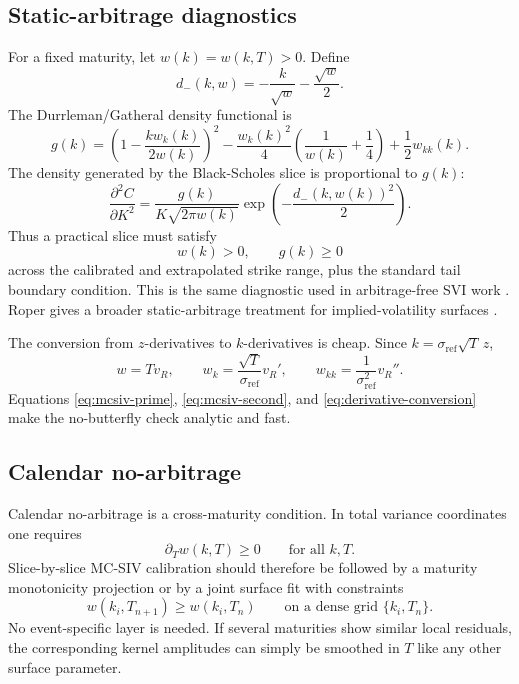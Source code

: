 \documentclass[11pt]{article}
\newcommand{\sigref}{\sigma_{\mathrm{ref}}}
\begin{document}
\subsection{Static-arbitrage diagnostics}
\label{sec:noarb}

For a fixed maturity, let $w(k)=w(k,T)>0$.  Define
\begin{equation}
  d_-(k,w)=-\frac{k}{\sqrt{w}}-\frac{\sqrt{w}}{2}.
\end{equation}
The Durrleman/Gatheral density functional is
\begin{equation}
  g(k)=
  \left(1-\frac{k w_k(k)}{2w(k)}\right)^2
  -\frac{w_k(k)^2}{4}
  \left(\frac{1}{w(k)}+\frac14\right)
  +\frac12 w_{kk}(k).
  \label{eq:g-function}
\end{equation}
The density generated by the Black-Scholes slice is proportional to $g(k)$:
\begin{equation}
  \frac{\partial^2 C}{\partial K^2}
  =\frac{g(k)}{K\sqrt{2\pi w(k)}}
  \exp\!\left(-\frac{d_-(k,w(k))^2}{2}\right).
  \label{eq:density-g}
\end{equation}
Thus a practical slice must satisfy
\begin{equation}
  w(k)>0,
  \qquad
  g(k)\ge0
  \label{eq:butterfly-conditions}
\end{equation}
across the calibrated and extrapolated strike range, plus the standard tail boundary condition.  This is the same diagnostic used in arbitrage-free SVI work \cite{gatheraljacquier2014}.  Roper gives a broader static-arbitrage treatment for implied-volatility surfaces \cite{roper2010}.

The conversion from $z$-derivatives to $k$-derivatives is cheap.  Since $k=\sigref\sqrt{T}\,z$,
\begin{equation}
  w=T v_R,
  \qquad
  w_k=\frac{\sqrt{T}}{\sigref}v_R',
  \qquad
  w_{kk}=\frac{1}{\sigref^2}v_R''.
  \label{eq:derivative-conversion}
\end{equation}
Equations \eqref{eq:mcsiv-prime}, \eqref{eq:mcsiv-second}, and \eqref{eq:derivative-conversion} make the no-butterfly check analytic and fast.

\subsection{Calendar no-arbitrage}

Calendar no-arbitrage is a cross-maturity condition.  In total variance coordinates one requires
\begin{equation}
  \partial_T w(k,T)\ge0
  \qquad\text{for all }k,T.
  \label{eq:calendar}
\end{equation}
Slice-by-slice MC-SIV calibration should therefore be followed by a maturity monotonicity projection or by a joint surface fit with constraints
\begin{equation}
  w(k_i,T_{n+1})\ge w(k_i,T_n)
  \qquad\text{on a dense grid }\{k_i,T_n\}.
  \label{eq:calendar-grid}
\end{equation}
No event-specific layer is needed.  If several maturities show similar local residuals, the corresponding kernel amplitudes can simply be smoothed in $T$ like any other surface parameter.
\end{document}
